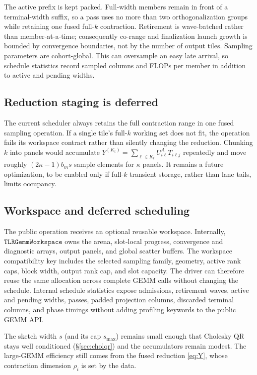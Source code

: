 \documentclass[11pt]{article}
\begin{document}
The active prefix is kept packed. Full-width members remain in front of a
terminal-width suffix, so a pass uses no more than two orthogonalization groups
while retaining one fused full-$k$ contraction. Retirement is wave-batched
rather than member-at-a-time; consequently co-range and finalization launch
growth is bounded by convergence boundaries, not by the number of output tiles.
Sampling parameters are cohort-global. This can oversample an easy late
arrival, so schedule statistics record sampled columns and FLOPs per member in
addition to active and pending widths.

\subsection{Reduction staging is deferred}
\label{sec:staging}

The current scheduler always retains the full contraction range in one fused
sampling operation. If a single tile's full-$k$ working set does not fit, the
operation fails its workspace contract rather than silently changing the
reduction. Chunking $k$ into panels would accumulate
$Y^{(K_t)}=\sum_{\ell\in K_t}U^A_{i\ell}T_{i\ell j}$ repeatedly and move roughly
$(2\kappa-1)b_ms$ sample elements for $\kappa$ panels. It remains a future
optimization, to be enabled only if full-$k$ transient storage, rather than
lane tails, limits occupancy.

\subsection{Workspace and deferred scheduling}
\label{sec:choose}

The public operation receives an optional reusable workspace. Internally,
$\texttt{TLRGemmWorkspace}$ owns the arena, slot-local progress, convergence
and diagnostic arrays, output panels, and global scatter buffers. The workspace
compatibility key includes the selected sampling family, geometry, active rank
caps, block width, output rank cap, and slot capacity. The driver can therefore
reuse the same allocation across complete GEMM calls without changing the
schedule. Internal schedule statistics expose admissions, retirement waves,
active and pending widths, passes, padded projection columns, discarded
terminal columns, and phase timings without adding profiling keywords to the
public GEMM API.

The sketch width $s$ (and its cap $s_{\max}$) remains small enough that
Cholesky QR stays well conditioned (\S\ref{sec:cholqr}) and the accumulators
remain modest. The large-GEMM efficiency still comes from the fused reduction
\eqref{eq:Y}, whose contraction dimension $\rho_i$ is set by the data.
\end{document}
